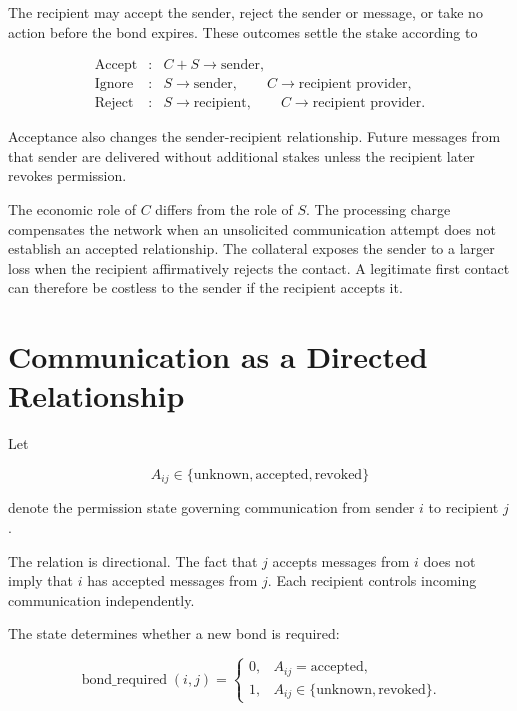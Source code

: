 \documentclass[11pt]{article}
\begin{document}
The recipient may accept the sender, reject the sender or message, or take no action before the bond expires. These outcomes settle the stake according to

\begin{equation}
\begin{array}{lll}
\text{Accept} &:& C+S \rightarrow \text{sender},\\[4pt]
\text{Ignore} &:& S \rightarrow \text{sender}, \qquad C \rightarrow \text{recipient provider},\\[4pt]
\text{Reject} &:& S \rightarrow \text{recipient}, \qquad C \rightarrow \text{recipient provider}.
\end{array}
\end{equation}

Acceptance also changes the sender-recipient relationship. Future messages from that sender are delivered without additional stakes unless the recipient later revokes permission.

The economic role of $C$ differs from the role of $S$. The processing charge compensates the network when an unsolicited communication attempt does not establish an accepted relationship. The collateral exposes the sender to a larger loss when the recipient affirmatively rejects the contact. A legitimate first contact can therefore be costless to the sender if the recipient accepts it.

\section{Communication as a Directed Relationship}

Let

\begin{equation}
A_{ij} \in \{\text{unknown},\text{accepted},\text{revoked}\}
\end{equation}

denote the permission state governing communication from sender $i$ to recipient $j$.

The relation is directional. The fact that $j$ accepts messages from $i$ does not imply that $i$ has accepted messages from $j$. Each recipient controls incoming communication independently.

The state determines whether a new bond is required:

\begin{equation}
\operatorname{bond\_required}(i,j)=
\begin{cases}
0, & A_{ij}=\text{accepted},\\
1, & A_{ij}\in\{\text{unknown},\text{revoked}\}.
\end{cases}
\end{equation}
\end{document}
